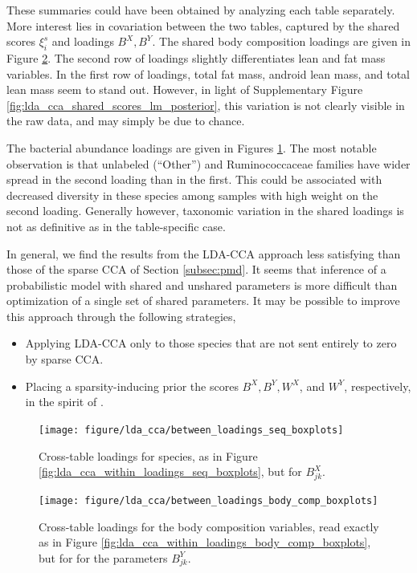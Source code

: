 \documentclass[14pt]{extarticle}
\begin{document}
These summaries could have been obtained by analyzing each table separately.
More interest lies in covariation between the two tables, captured by the shared
scores $\xi_{i}^{s}$ and loadings $B^{X}, B^{Y}$. The shared body composition
loadings are given in Figure
\ref{fig:lda_cca_between_loadings_body_comp_boxplots}. The second row of
loadings slightly differentiates lean and fat mass variables. In the first row
of loadings, total fat mass, android lean mass, and total lean mass seem to
stand out. However, in light of Supplementary Figure
\ref{fig:lda_cca_shared_scores_lm_posterior}, this variation is not clearly
visible in the raw data, and may simply be due to chance.

The bacterial abundance loadings are given in Figures
\ref{fig:lda_cca_between_loadings_seq_boxplots}. The most notable observation is
that unlabeled (``Other'') and Ruminococcaceae families have wider spread in the
second loading than in the first. This could be associated with decreased
diversity in these species among samples with high weight on the second loading.
Generally however, taxonomic variation in the shared loadings is not as
definitive as in the table-specific case.

In general, we find the results from the LDA-CCA approach less satisfying than
those of the sparse CCA of Section \ref{subsec:pmd}. It seems that inference of
a probabilistic model with shared and unshared parameters is more difficult than
optimization of a single set of shared parameters. It may be possible to improve
this approach through the following strategies,

\begin{itemize}
\item Applying LDA-CCA only to those species that are not sent entirely to zero by
  sparse CCA.
\item Placing a sparsity-inducing prior the scores $B^{X}, B^{Y}, W^{X}$, and
  $W^{Y}$, respectively, in the spirit of \citep{archambeau2009sparse}.
\end{itemize}

\begin{figure}
  \centering
  \texttt{[image: figure/lda\_cca/between\_loadings\_seq\_boxplots]}
  \caption{Cross-table loadings for species, as in
    Figure \ref{fig:lda_cca_within_loadings_seq_boxplots}, but for
    $B^{X}_{jk}$. \label{fig:lda_cca_between_loadings_seq_boxplots} }
\end{figure}

\begin{figure}
  \centering
  \texttt{[image: figure/lda\_cca/between\_loadings\_body\_comp\_boxplots]}
  \caption{Cross-table loadings for the body composition variables, read exactly
    as in Figure \ref{fig:lda_cca_within_loadings_body_comp_boxplots}, but for for the
    parameters
    $B^{Y}_{jk}$. \label{fig:lda_cca_between_loadings_body_comp_boxplots}}
\end{figure}
\end{document}
